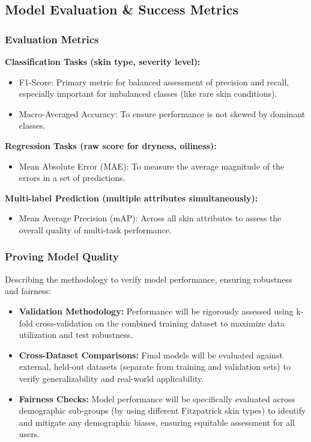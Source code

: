 \documentclass[12pt,a4paper]{article}
\begin{document}
\subsection{Model Evaluation \& Success Metrics}
\subsubsection{Evaluation Metrics}
\textbf{Classification Tasks (skin type, severity level):}
\begin{itemize}
    \item F1-Score: Primary metric for balanced assessment of precision and recall, especially important for imbalanced classes (like rare skin conditions).
    \item Macro-Averaged Accuracy: To ensure performance is not skewed by dominant classes.
\end{itemize}
\textbf{Regression Tasks (raw score for dryness, oiliness):}
\begin{itemize}
    \item Mean Absolute Error (MAE): To measure the average magnitude of the errors in a set of predictions.
\end{itemize}
\textbf{Multi-label Prediction (multiple attributes simultaneously):}
\begin{itemize}
    \item Mean Average Precision (mAP): Across all skin attributes to assess the overall quality of multi-task performance.
\end{itemize}

\subsubsection{Proving Model Quality}
Describing the methodology to verify model performance, ensuring robustness and fairness:
\begin{itemize}
    \item \textbf{Validation Methodology:} Performance will be rigorously assessed using k-fold cross-validation on the combined training dataset to maximize data utilization and test robustness.
    \item \textbf{Cross-Dataset Comparisons:} Final models will be evaluated against external, held-out datasets (separate from training and validation sets) to verify generalizability and real-world applicability.
    \item \textbf{Fairness Checks:} Model performance will be specifically evaluated across demographic sub-groups (by using different Fitzpatrick skin types) to identify and mitigate any demographic biases, ensuring equitable assessment for all users.
\end{itemize}
\end{document}

